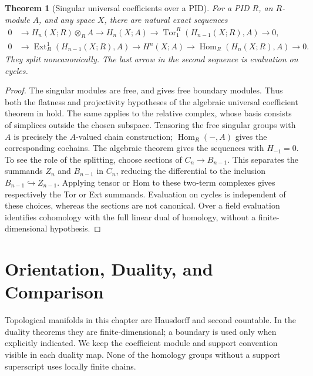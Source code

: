 \documentclass[11pt,oneside,openany]{book}
\theoremstyle{plain}
\newtheorem{theorem}{Theorem}[chapter]
\theoremstyle{definition}
\theoremstyle{remark}
\begin{document}
\begin{theorem}[Singular universal coefficients over a PID]\label{thm:p202-topological-uct}
For a PID \(R\), an \(R\)-module \(A\), and any space \(X\),
there are natural exact sequences
\[
 \begin{split}
 0&\longrightarrow H_n(X;R)\otimes_R A
 \longrightarrow H_n(X;A)
 \longrightarrow \operatorname{Tor}_1^R(H_{n-1}(X;R),A)
 \longrightarrow0,\\
 0&\longrightarrow \operatorname{Ext}^1_R(H_{n-1}(X;R),A)
 \longrightarrow H^n(X;A)
 \longrightarrow \operatorname{Hom}_R(H_n(X;R),A)
 \longrightarrow0 .
 \end{split}
\]
They split noncanonically. The last arrow in the second
sequence is evaluation on cycles.
\end{theorem}
\begin{proof}
The singular modules are free, and \cite[Lemma 11.7]{P103} gives
free boundary modules. Thus both the flatness and projectivity hypotheses of the
algebraic universal coefficient theorem in
\cite[Chapter 11]{P103} hold. The same applies to the
relative complex, whose basis consists of simplices outside
the chosen subspace. Tensoring the free singular groups
with \(A\) is precisely the \(A\)-valued chain construction;
\(\operatorname{Hom}_R(-,A)\) gives the corresponding
cochains. The algebraic theorem gives the sequences with
\(H_{-1}=0\). To see the role of the splitting, choose
sections of \(C_n\to B_{n-1}\). This separates the summands
\(Z_n\) and \(B_{n-1}\) in \(C_n\), reducing the differential
to the inclusion \(B_{n-1}\hookrightarrow Z_{n-1}\).
Applying tensor or Hom to these two-term complexes gives
respectively the Tor or Ext summands. Evaluation on cycles
is independent of these choices, whereas the sections are
not canonical. Over a field evaluation identifies cohomology
with the full linear dual of homology, without a
finite-dimensional hypothesis.
\end{proof}

\chapter{Orientation, Duality, and Comparison}

Topological manifolds in this chapter are Hausdorff and second
countable. In the duality theorems they are finite-dimensional;
a boundary is used only when explicitly indicated. We keep the
coefficient module and support convention visible in each duality
map. None of the homology groups without a support superscript
uses locally finite chains.
\end{document}
